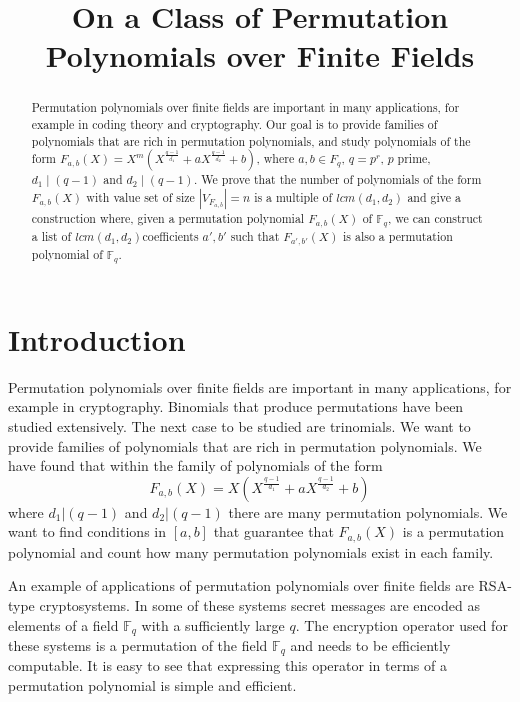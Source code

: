\documentclass{article}
\theoremstyle{definition}
\theoremstyle{remark}
\numberwithin{equation}{section}
\begin{document}
\title{On a Class of Permutation Polynomials over Finite Fields}


\maketitle

\begin{abstract}
Permutation polynomials over finite fields are important in many applications, for example in coding theory and cryptography. Our goal is to provide families of polynomials that are rich in permutation polynomials, and study polynomials of the form $F_{a,b}(X) =X^m\left(X^{\frac{q-1}{d_1}} + a X^{\frac{q-1}{d_2}} + b \right)$, where $a,b \in F_{q}$, $q=p^r$, $p$ prime, $d_1 \mid (q-1)$ and $d_2 \mid (q-1)$. We prove that the number of polynomials of the form $F_{a,b}(X)$ with value set of size $\left\vert V_{F_{a,b}} \right\vert =n$ is a multiple of $lcm(d_1,d_2)$ and give a construction where, given a permutation polynomial $F_{a,b}(X)$ of $\mathbb{F}_q$, we can construct a list of $lcm(d_1,d_2)$coefficients $a',b'$ such that $F_{a',b'}(X)$ is also a permutation polynomial of $\mathbb{F}_q$.
\end{abstract}


\section{Introduction}

Permutation polynomials over finite fields are important in many applications, for example in cryptography. Binomials that produce permutations have been studied extensively. The next case to be studied are trinomials. We want to provide families of polynomials that are rich in permutation polynomials. We have found that within the family of polynomials of the form $$F_{a,b}(X) = X(X^{\frac{q-1}{d_1}} + aX^{\frac{q-1}{d_2}} +b)$$ where $d_1 | (q-1)$ and $d_2 | (q-1)$  there are many permutation polynomials. We want to find conditions in $[a,b]$ that guarantee that $F_{a,b}(X)$ is a permutation polynomial and count how many permutation polynomials exist in each family.

An example of applications of permutation polynomials over finite fields are RSA-type cryptosystems. In some of these systems secret messages are encoded as elements of a field $\mathbb{F}_{q}$ with a sufficiently large $q$. The encryption operator used for these systems is a permutation of the field $\mathbb{F}_{q}$ and needs to be efficiently computable. It is easy to see that expressing this operator in terms of a permutation polynomial is simple and efficient.
\end{document}
